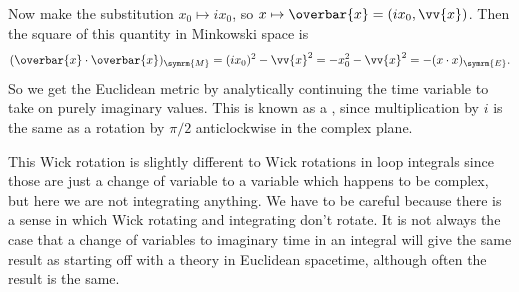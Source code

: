 \documentclass[fleqn]{NotesClass}
\newcommand{\minkowski}{\symrm{M}}
\newcommand{\euclidean}{\symrm{E}}
\begin{document}
    Now make the substitution \(x_0 \mapsto ix_0\), so \(x \mapsto \overbar{x} =  (ix_0, \vv{x})\).
    Then the square of this quantity in Minkowski space is
    \begin{equation}
        (\overbar{x} \cdot \overbar{x})_{\minkowski} = (ix_0)^2 - \vv{x}^2 = -x_0^2 - \vv{x}^2 = -(x \cdot x)_{\euclidean}.
    \end{equation}
    So we get the Euclidean metric by analytically continuing the time variable to take on purely imaginary values.
    This is known as a , since multiplication by \(i\) is the same as a rotation by \(\pi/2\) anticlockwise in the complex plane.
    
    This Wick rotation is slightly different to Wick rotations in loop integrals since those are just a change of variable to a variable which happens to be complex, but here we are not integrating anything.
    We have to be careful because there is a sense in which Wick rotating and integrating don't rotate.
    It is not always the case that a change of variables to imaginary time in an integral will give the same result as starting off with a theory in Euclidean spacetime, although often the result is the same.
    
\end{document}
